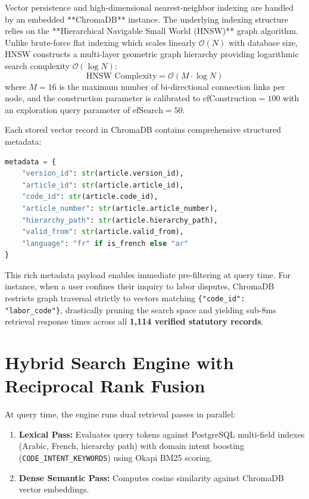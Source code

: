 \documentclass[12pt,a4paper]{report}
\begin{document}
Vector persistence and high-dimensional nearest-neighbor indexing are handled by an embedded **ChromaDB** instance. The underlying indexing structure relies on the **Hierarchical Navigable Small World (HNSW)** graph algorithm. Unlike brute-force flat indexing which scales linearly $\mathcal{O}(N)$ with database size, HNSW constructs a multi-layer geometric graph hierarchy providing logarithmic search complexity $\mathcal{O}(\log N)$:
\begin{equation}
\text{HNSW Complexity} = \mathcal{O}(M \cdot \log N)
\label{eq:hnsw_complexity}
\end{equation}
where $M = 16$ is the maximum number of bi-directional connection links per node, and the construction parameter is calibrated to $\text{efConstruction} = 100$ with an exploration query parameter of $\text{efSearch} = 50$. 

Each stored vector record in ChromaDB contains comprehensive structured metadata:
\begin{lstlisting}[language=Python, caption={ChromaDB Legal Vector Metadata Schema}]
metadata = {
    "version_id": str(article.version_id),
    "article_id": str(article.article_id),
    "code_id": str(article.code_id),
    "article_number": str(article.article_number),
    "hierarchy_path": str(article.hierarchy_path),
    "valid_from": str(article.valid_from),
    "language": "fr" if is_french else "ar"
}
\end{lstlisting}

This rich metadata payload enables immediate pre-filtering at query time. For instance, when a user confines their inquiry to labor disputes, ChromaDB restricts graph traversal strictly to vectors matching \texttt{\{"code\_id": "labor\_code"\}}, drastically pruning the search space and yielding sub-8ms retrieval response times across all \textbf{1,114 verified statutory records}.

\section{Hybrid Search Engine with Reciprocal Rank Fusion}
At query time, the engine runs dual retrieval passes in parallel:
\begin{enumerate}[leftmargin=20pt, itemsep=3pt]
    \item \textbf{Lexical Pass:} Evaluates query tokens against PostgreSQL multi-field indexes (Arabic, French, hierarchy path) with domain intent boosting (\texttt{CODE\_INTENT\_KEYWORDS}) using Okapi BM25 scoring.
    \item \textbf{Dense Semantic Pass:} Computes cosine similarity against ChromaDB vector embeddings.
\end{enumerate}
\end{document}

